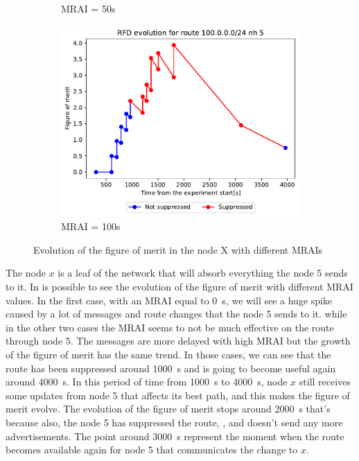 \begin{figure}[h]
\begin{subfigure}[b]{0.3\textwidth}
         \caption{MRAI = 50s}
         \label{fig:clique_x_mrai50}
     \end{subfigure}
     \hfill
     \begin{subfigure}[b]{0.3\textwidth}
         \centering
         \includegraphics[width=\textwidth]{images/RFD/clique/FigureOfMerit/mrai21_RFD_x_rfd_R1.pdf}
         \caption{MRAI = 100s}
         \label{fig:clique_x_mrai100}
     \end{subfigure}
        \caption{Evolution of the figure of merit in the node X with different MRAIs}
        \label{fig:clique_nodex}
\end{figure}

The node $x$ is a leaf of the network that will absorb everything the node \num{5}
sends to it.
In  is possible to see the evolution of the figure of merit
with different \ac{MRAI} values.
In the first case, with an \ac{MRAI} equal to \SI{0}{\second}, we will see a huge
spike caused by a lot of messages and route changes that the node \num{5} sends
to it.
while in the other two cases  
the \ac{MRAI} seems to not be much effective on the route through node \num{5}.
The messages are more delayed with high \ac{MRAI} but the growth of the figure
of merit has the same trend.
In those cases, we can see that the route has been suppressed around \SI{1000}{\second}
and is going to become useful again around \SI{4000}{\second}.
In this period of time from \SI{1000}{\second} to \SI{4000}{\second}, node $x$ still
receives some updates from node \num{5} that affects its best path, and this
makes the figure of merit evolve.
The evolution of the figure of merit stops around \SI{2000}{\second} that's because
also, the node \num{5} has suppressed the route, , and
doesn't send any more advertisements.
The point around \SI{3000}{\second} represent the moment when the route becomes
available again for node \num{5} that communicates the change to $x$.


